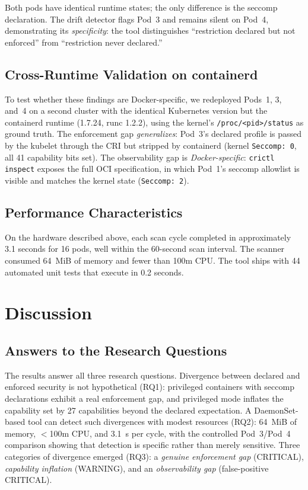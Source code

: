 \documentclass[conference]{IEEEtran}
\begin{document}
Both pods have identical runtime states; the only difference is the seccomp declaration. The drift detector flags Pod~3 and remains silent on Pod~4, demonstrating its \emph{specificity}: the tool distinguishes ``restriction declared but not enforced'' from ``restriction never declared.''

\subsection{Cross-Runtime Validation on containerd}
\label{sec:crossruntime}

To test whether these findings are Docker-specific, we redeployed Pods~1, 3, and~4 on a second cluster with the identical Kubernetes version but the containerd runtime (1.7.24, runc 1.2.2), using the kernel's \texttt{/proc/<pid>/status} as ground truth. The enforcement gap \emph{generalizes}: Pod~3's declared profile is passed by the kubelet through the CRI but stripped by containerd (kernel \texttt{Seccomp:~0}, all 41 capability bits set). The observability gap is \emph{Docker-specific}: \texttt{crictl inspect} exposes the full OCI specification, in which Pod~1's seccomp allowlist is visible and matches the kernel state (\texttt{Seccomp:~2}).

\subsection{Performance Characteristics}

On the hardware described above, each scan cycle completed in approximately 3.1 seconds for 16 pods, well within the 60-second scan interval. The scanner consumed 64~MiB of memory and fewer than 100m CPU. The tool ships with 44 automated unit tests that execute in 0.2 seconds.

\section{Discussion}

\subsection{Answers to the Research Questions}

The results answer all three research questions. Divergence between declared and enforced security is not hypothetical (RQ1): privileged containers with seccomp declarations exhibit a real enforcement gap, and privileged mode inflates the capability set by 27 capabilities beyond the declared expectation. A DaemonSet-based tool can detect such divergences with modest resources (RQ2): 64~MiB of memory, $<$100m CPU, and 3.1~s per cycle, with the controlled Pod~3/Pod~4 comparison showing that detection is specific rather than merely sensitive. Three categories of divergence emerged (RQ3): a \emph{genuine enforcement gap} (CRITICAL), \emph{capability inflation} (WARNING), and an \emph{observability gap} (false-positive CRITICAL).
\end{document}
